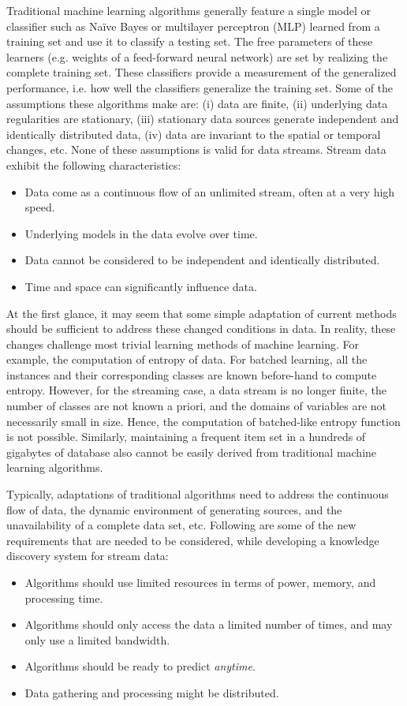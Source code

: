Traditional machine learning algorithms generally feature a single model or classifier such as Na\"ive Bayes or multilayer perceptron (MLP) learned from a training set and use it to classify a testing set. The free parameters of these learners (e.g. weights of a feed-forward neural network) are set by realizing the complete training set. These classifiers provide a measurement of the generalized performance, i.e. how well the classifiers generalize the training set. Some of the assumptions these algorithms make are: (i) data are finite, (ii) underlying data regularities are stationary, (iii) stationary data sources generate independent and identically distributed data, (iv) data are invariant to the spatial or temporal changes, etc. None of these assumptions is valid for data streams. Stream data exhibit the following characteristics: 
\begin{itemize}
    \item Data come as a continuous flow of an unlimited stream, often at a very high speed.
    \item Underlying models in the data evolve over time.
    \item Data cannot be considered to be independent and identically distributed.
    \item Time and space can significantly influence data.
\end{itemize}
At the first glance, it may seem that some simple adaptation of current methods should be sufficient to address these changed conditions in data. In reality, these changes challenge most trivial learning methods of machine learning. For example, the computation of entropy of data. For batched learning, all the instances and their corresponding classes are known before-hand to compute entropy. However, for the streaming case, a data stream is no longer finite, the number of classes are not known a priori, and the domains of variables are not necessarily small in size. Hence, the computation of batched-like entropy function is not possible. Similarly, maintaining a frequent item set in a hundreds of gigabytes of database also cannot be easily derived from traditional machine learning algorithms.

Typically, adaptations of traditional algorithms need to address the continuous flow of data, the dynamic environment of generating sources, and the unavailability of a complete data set, etc. Following are some of the new requirements that are needed to be considered, while developing a knowledge discovery system for stream data:
\begin{itemize}
    \item Algorithms should use limited resources in terms of power, memory, and processing time.
    \item Algorithms should only access the data a limited number of times, and may only use a limited bandwidth.
    \item Algorithms should be ready to predict {\it anytime}. 
    \item Data gathering and processing might be distributed.
\end{itemize}

